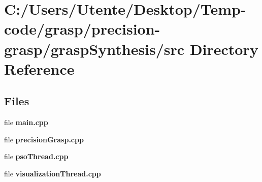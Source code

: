 \section{C\+:/\+Users/\+Utente/\+Desktop/\+Temp-\/code/grasp/precision-\/grasp/grasp\+Synthesis/src Directory Reference}
\label{dir_93bb1b7d481c79442225c7635cbc7aeb}
\subsection*{Files}
\begin{DoxyCompactItemize}
\item 
file {\bfseries main.\+cpp}
\item 
file {\bfseries precision\+Grasp.\+cpp}
\item 
file {\bfseries pso\+Thread.\+cpp}
\item 
file {\bfseries visualization\+Thread.\+cpp}
\end{DoxyCompactItemize}
